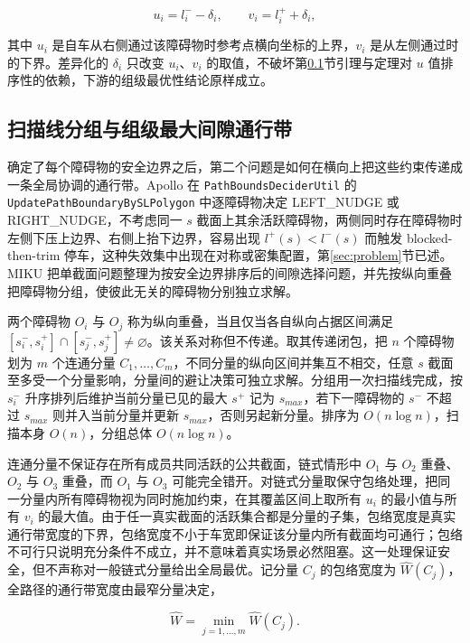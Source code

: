 \documentclass[a4paper,zihao=5]{ctexart}
\theoremstyle{definition}
\begin{document}
\begin{equation}
    u_i = l_i^{-} - \delta_i, \qquad v_i = l_i^{+} + \delta_i,
    \label{eq:dynamic_uv}
\end{equation}

其中 $u_i$ 是自车从右侧通过该障碍物时参考点横向坐标的上界，$v_i$ 是从左侧通过时的下界。差异化的 $\delta_i$ 只改变 $u_i$、$v_i$ 的取值，不破坏第\ref{sec:method_band}节引理与定理对 $u$ 值排序性的依赖，下游的组级最优性结论原样成立。

\subsection{扫描线分组与组级最大间隙通行带}
\label{sec:method_band}

确定了每个障碍物的安全边界之后，第二个问题是如何在横向上把这些约束传递成一条全局协调的通行带。Apollo 在 \texttt{PathBoundsDeciderUtil} 的 \texttt{UpdatePathBoundaryBySLPolygon} 中逐障碍物决定 LEFT\_NUDGE 或 RIGHT\_NUDGE，不考虑同一 $s$ 截面上其余活跃障碍物，两侧同时存在障碍物时左侧下压上边界、右侧上抬下边界，容易出现 $l^{+}(s)<l^{-}(s)$ 而触发 blocked-then-trim 停车，这种失效集中出现在对称或密集配置，第\ref{sec:problem}节已述。MIKU 把单截面问题整理为按安全边界排序后的间隙选择问题，并先按纵向重叠把障碍物分组，使彼此无关的障碍物分别独立求解。

两个障碍物 $O_i$ 与 $O_j$ 称为纵向重叠，当且仅当各自纵向占据区间满足 $[s_i^{-}, s_i^{+}] \cap [s_j^{-}, s_j^{+}] \neq \varnothing$。该关系对称但不传递。取其传递闭包，把 $n$ 个障碍物划为 $m$ 个连通分量 $C_1, \ldots, C_m$，不同分量的纵向区间并集互不相交，任意 $s$ 截面至多受一个分量影响，分量间的避让决策可独立求解。分组用一次扫描线完成，按 $s_i^{-}$ 升序排列后维护当前分量已见的最大 $s^{+}$ 记为 $s_{max}$，若下一障碍物的 $s^{-}$ 不超过 $s_{max}$ 则并入当前分量并更新 $s_{max}$，否则另起新分量。排序为 $O(n\log n)$，扫描本身 $O(n)$，分组总体 $O(n\log n)$。

连通分量不保证存在所有成员共同活跃的公共截面，链式情形中 $O_1$ 与 $O_2$ 重叠、$O_2$ 与 $O_3$ 重叠，而 $O_1$ 与 $O_3$ 可能完全错开。对链式分量取保守包络处理，把同一分量内所有障碍物视为同时施加约束，在其覆盖区间上取所有 $u_i$ 的最小值与所有 $v_i$ 的最大值。由于任一真实截面的活跃集合都是分量的子集，包络宽度是真实通行带宽度的下界，包络宽度不小于车宽即保证该分量内所有截面均可通行；包络不可行只说明充分条件不成立，并不意味着真实场景必然阻塞。这一处理保证安全，但不声称对一般链式分量给出全局最优。记分量 $C_j$ 的包络宽度为 $\hat{W}(C_j)$，全路径的通行带宽度由最窄分量决定，

\begin{equation}
    \hat{W} = \min_{j=1,\ldots,m} \hat{W}(C_j).
    \label{eq:global_width}
\end{equation}
\end{document}

